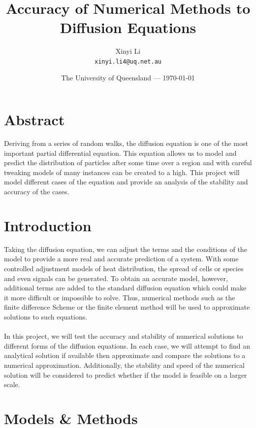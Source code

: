 \documentclass{article}
\title{Accuracy of Numerical Methods to Diffusion Equations} %
\author{Xinyi Li\\ \texttt{xinyi.li4@uq.net.au}} %
\date{The University of Queensland --- \today} %
\begin{document}
\maketitle %


\section*{Abstract} %

Deriving from a series of random walks, the diffusion equation is one of the most important partial differential equation. This equation allows us to model and predict the distribution of particles after some time over a region and with careful tweaking models of many instances can be created to a high. This project will model different cases of the equation and provide an analysis of the stability and accuracy of the cases.

\section{Introduction} %

Taking the diffusion equation, we can adjust the terms and the conditions of the model to provide a more real and accurate prediction of a system. With some controlled adjustment models of heat distribution, the spread of cells or species and even signals can be generated. To obtain an accurate model, however, additional terms are added to the standard diffusion equation which could make it more difficult or impossible to solve. Thus, numerical methods such as the finite difference Scheme or the finite element method will be used to approximate solutions to such equations.
\\
\\
In this project, we will test the accuracy and stability of numerical solutions to different forms of the diffusion equations. In each case, we will attempt to find an analytical solution if available then approximate and compare the solutions to a numerical approximation. Additionally, the stability and speed of the numerical solution will be considered to predict whether if the model is feasible on a larger scale.

\section{Models \& Methods}
\end{document}
